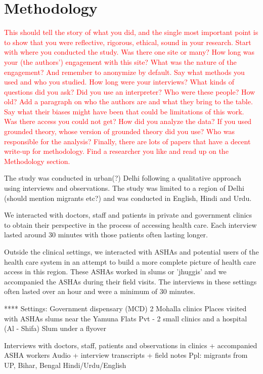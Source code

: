 \section{Methodology}
\textcolor{red}{This should tell the story of what you did, and the single most important point is to show that you were reflective, rigorous, ethical, sound in your research. 
Start with where you conducted the study. Was there one site or many? How long was your (the authors’) engagement with this site? What was the nature of the engagement? And remember to anonymize by default.
Say what methods you used and who you studied. How long were your interviews? What kinds of questions did you ask? Did you use an interpreter? Who were these people? How old?
Add a paragraph on who the authors are and what they bring to the table. Say what their biases might have been that could be limitations of this work. Was there access you could not get? 
How did you analyze the data? If you used grounded theory, whose version of grounded theory did you use? Who was responsible for the analysis? 
Finally, there are lots of papers that have a decent write-up for methodology. Find a researcher you like and read up on the Methodology section.
}

The study was conducted in urban(?) Delhi following a qualitative approach using interviews and observations. The study was limited to a region of Delhi (should mention migrants etc?) and was conducted in English, Hindi and Urdu.

We interacted with doctors, staff and patients in private and government clinics to obtain their perspective in the process of accessing health care. Each interview lasted around 30 minutes with those patients often lasting longer. 

Outside the clinical settings, we interacted with ASHAs and potential users of the health care system in an attempt to build a more complete picture of health care access in this region. These ASHAs worked in slums or 'jhuggis' and we accompanied the ASHAs during their field visits. The interviews in these settings often lasted over an hour and were a minimum of 30 minutes.

****
Settings:
Government dispensary (MCD)
2 Mohalla clinics
Places visited with ASHAs
slums near the Yamuna
Flats
Pvt - 2 small clinics and a hospital (Al - Shifa)
Slum under a flyover

Interviews with doctors, staff, patients and observations in clinics + accompanied ASHA workers
Audio + interview transcripts + field notes
Ppl: migrants from UP, Bihar, Bengal
Hindi/Urdu/English